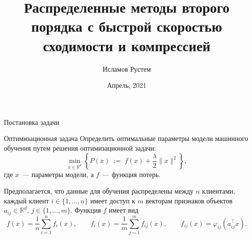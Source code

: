 \documentclass[aspectratio=169,xcolor=dvipsnames]{beamer}
\title[short title]{Распределенные методы второго порядка с быстрой скоростью сходимости и компрессией}
\author[Rustem] {Исламов Рустем}
\institute[NTU] %
{
    Московский физико-технический институт\\
    Кафедра Интеллектуальных систем\\
    \vskip 10pt
    Научный руководитель: д.ф.-м.н. Стрижов В.В.
}
\date{Апрель, 2021} %
\newcommand{\eqdef}{\; { := }\;}
\newcommand{\R}{\mathbb{R}}
\begin{document}
\begin{frame}
    \titlepage
\end{frame}



\begin{frame}{Постановка задачи}
    \begin{block}{Оптимизационная задача}
        Определить оптимальные параметры модели машинного обучения путем решения оптимизационной задачи:
        \begin{equation}
            \min\limits_{x\in \R^d}\left\{P(x) \eqdef f(x) + \frac{\lambda}{2}\|x\|^2\right\},
        \end{equation}
        где $x$~--- параметры модели, а $f$~--- функция потерь.
    \end{block}
    Предполагается, что данные для обучения распределены между $n$ клиентами, каждый клиент $i \in \{1,\dots,n\}$ имеет доступ к $m$ векторам признаков объектов $a_{ij}\in \R^d$, $j\in \{1,\dots,m\}$. Функция $f$ имеет вид
    \begin{equation}
        f(x) = \frac{1}{n}\sum\limits_{i=1}^n f_i(x), \qquad f_i(x) = \frac{1}{m}\sum\limits_{j=1}^m f_{ij}(x), \qquad f_{ij}(x) = \varphi_{ij}(a_{ij}^\top x).
    \end{equation}
\end{frame}
\end{document}
